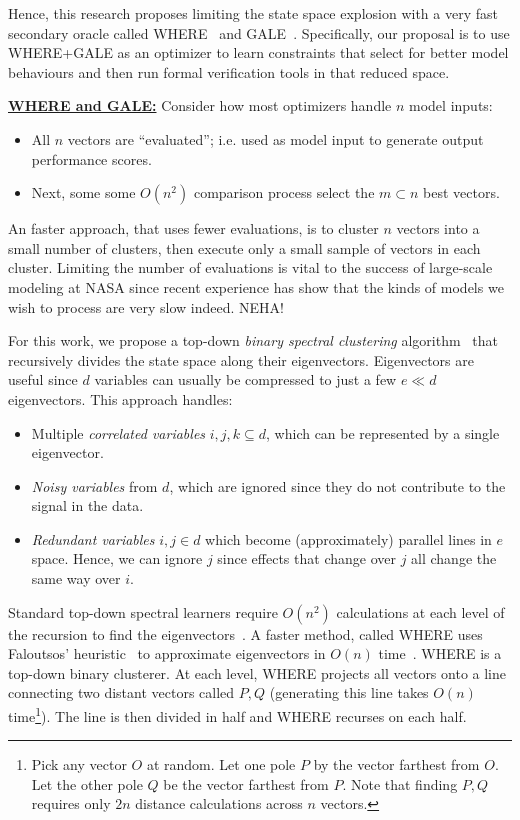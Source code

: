 \documentclass[12pt]{article}
\newcommand{\bi}{\begin{itemize}[leftmargin=0.5cm]}
\newcommand{\ei}{\end{itemize}}
\begin{document}
Hence, this research proposes limiting the state space explosion with a very fast secondary oracle called WHERE~\cite{me12d} and GALE~\cite{krall2015gale}. 
Specifically, 
our proposal is to use WHERE+GALE as an optimizer to learn constraints that select for better model behaviours and then run formal verification tools in that reduced space.

\newpage\noindent
\underline{{\bf WHERE and GALE:}} 
Consider 
how most optimizers handle  $n$ model inputs:
\bi
\item
 All $n$ vectors are ``evaluated''; i.e. used as model input to
 generate   output performance scores. 
\item
Next, some   some $O(n^2)$ comparison process  select the $m \subset n$ best vectors.
\ei
An faster approach, that uses fewer evaluations, is to cluster $n$ vectors
into a small number of clusters, then
 execute only a small sample of vectors in each cluster.
 Limiting the number of evaluations is vital to the success of large-scale modeling
 at NASA since recent experience has show that the kinds of models we wish to process
 are very slow indeed. NEHA!
 
 
For this work, we propose a top-down  {\em binary spectral clustering} algorithm~\cite{kamvar03} 
that recursively divides
the state space along their eigenvectors. Eigenvectors are useful since 
  $d$ variables can usually be compressed to just
  a few $e \ll d$ eigenvectors. This approach handles:
\bi
\item
Multiple {\em correlated variables} $i,j,k \subseteq d$, which can be represented
by a single  eigenvector.
\item
{\em Noisy variables} from $d$, which are 
ignored since they  do not contribute to the signal in the data.
\item
{\em Redundant  variables} \mbox{$i,j \in d$} which become (approximately) parallel lines
in $e$ space. Hence, we 
can ignore $j$ 
since effects that change over $j$ all
change   the same way over $i$.
\ei
Standard top-down spectral learners require  $O(n^2)$ calculations at each level 
of the recursion to find the eigenvectors~\cite{boley98}. A faster method, called WHERE 
uses Faloutsos'  heuristic~\cite{Faloutsos1995} to
approximate eigenvectors   in $O(n)$ time~\cite{platt05}.
WHERE  is a top-down binary clusterer.  
At each level, WHERE  projects all  vectors onto a line connecting two distant vectors called $P,Q$ (generating this line takes $O(n)$ time\footnote{Pick any vector $O$ at random. Let one pole $P$ by the
vector farthest from $O$. Let the other pole $Q$ be the vector farthest from $P$. Note that
finding $P,Q$ requires only $2n$ distance calculations across $n$ vectors.}).
The line is then divided in half
and WHERE recurses on each half. 
\end{document}
